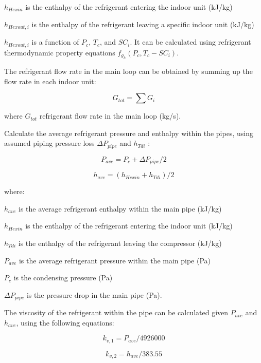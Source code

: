 \(h_{Hexin}\) is the enthalpy of the refrigerant entering the indoor unit (kJ/kg)

\(h_{Hexout,i}\) is the enthalpy of the refrigerant leaving a specific indoor unit (kJ/kg)

\(h_{Hexout,i}\) is a function of \(P_c\), \(T_c\), and \(SC_i\). It can be calculated using refrigerant thermodynamic property equations \(f_{g_h}(P_c,T_c-SC_i)\).

The refrigerant flow rate in the main loop can be obtained by summing up the flow rate in each indoor unit:

\begin{equation}
G_{tot} = \sum{G_i}
\end{equation}

where \(G_{tot}\) refrigerant flow rate in the main loop (kg/s).

Calculate the average refrigerant pressure and enthalpy within the pipes, using assumed piping pressure loss \(\Delta{P_{pipe}}\) and \(h_{Tdi}\) :

\begin{equation}
P_{ave} = P_c+\Delta{P_{pipe}}/2
\end{equation}

\begin{equation}
h_{ave} = (h_{Hexin}+h_{Tdi})/2
\end{equation}

where:

\(h_{ave}\) is the average refrigerant enthalpy within the main pipe (kJ/kg)

\(h_{Hexin}\) is the enthalpy of the refrigerant entering the indoor unit (kJ/kg)

\(h_{Tdi}\) is the enthalpy of the refrigerant leaving the compressor (kJ/kg)

\(P_{ave}\) is the average refrigerant pressure within the main pipe (Pa)

\(P_c\) is the condensing pressure (Pa)

\(\Delta{P_{pipe}}\) is the pressure drop in the main pipe (Pa).

The viscosity of the refrigerant within the pipe can be calculated given \(P_{ave}\) and \(h_{ave}\), using the following equations:

\begin{equation}
k_{v,1} = P_{ave}/4926000
\end{equation}

\begin{equation}
k_{v,2} = h_{ave}/383.55
\end{equation}

